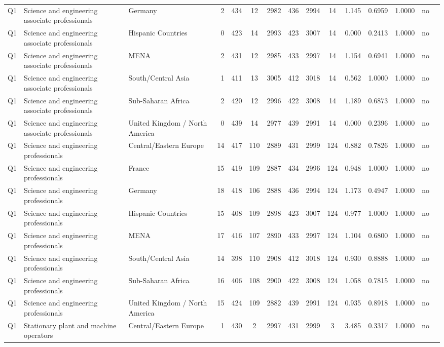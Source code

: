\begin{longtable}{lllrcccccccccll}
Q1 & Science and engineering associate professionals & Germany & 2 & 434 & 12 & 2982 & 436 & 2994 & 14 & 1.145 & 0.6959 & 1.0000 & no \\
Q1 & Science and engineering associate professionals & Hispanic Countries & 0 & 423 & 14 & 2993 & 423 & 3007 & 14 & 0.000 & 0.2413 & 1.0000 & no \\
Q1 & Science and engineering associate professionals & MENA & 2 & 431 & 12 & 2985 & 433 & 2997 & 14 & 1.154 & 0.6941 & 1.0000 & no \\
Q1 & Science and engineering associate professionals & South/Central Asia & 1 & 411 & 13 & 3005 & 412 & 3018 & 14 & 0.562 & 1.0000 & 1.0000 & no \\
Q1 & Science and engineering associate professionals & Sub-Saharan Africa & 2 & 420 & 12 & 2996 & 422 & 3008 & 14 & 1.189 & 0.6873 & 1.0000 & no \\
Q1 & Science and engineering associate professionals & United Kingdom / North America & 0 & 439 & 14 & 2977 & 439 & 2991 & 14 & 0.000 & 0.2396 & 1.0000 & no \\
Q1 & Science and engineering professionals & Central/Eastern Europe & 14 & 417 & 110 & 2889 & 431 & 2999 & 124 & 0.882 & 0.7826 & 1.0000 & no \\
Q1 & Science and engineering professionals & France & 15 & 419 & 109 & 2887 & 434 & 2996 & 124 & 0.948 & 1.0000 & 1.0000 & no \\
Q1 & Science and engineering professionals & Germany & 18 & 418 & 106 & 2888 & 436 & 2994 & 124 & 1.173 & 0.4947 & 1.0000 & no \\
Q1 & Science and engineering professionals & Hispanic Countries & 15 & 408 & 109 & 2898 & 423 & 3007 & 124 & 0.977 & 1.0000 & 1.0000 & no \\
Q1 & Science and engineering professionals & MENA & 17 & 416 & 107 & 2890 & 433 & 2997 & 124 & 1.104 & 0.6800 & 1.0000 & no \\
Q1 & Science and engineering professionals & South/Central Asia & 14 & 398 & 110 & 2908 & 412 & 3018 & 124 & 0.930 & 0.8888 & 1.0000 & no \\
Q1 & Science and engineering professionals & Sub-Saharan Africa & 16 & 406 & 108 & 2900 & 422 & 3008 & 124 & 1.058 & 0.7815 & 1.0000 & no \\
Q1 & Science and engineering professionals & United Kingdom / North America & 15 & 424 & 109 & 2882 & 439 & 2991 & 124 & 0.935 & 0.8918 & 1.0000 & no \\
Q1 & Stationary plant and machine operators & Central/Eastern Europe & 1 & 430 & 2 & 2997 & 431 & 2999 & 3 & 3.485 & 0.3317 & 1.0000 & no \\

\end{longtable}
